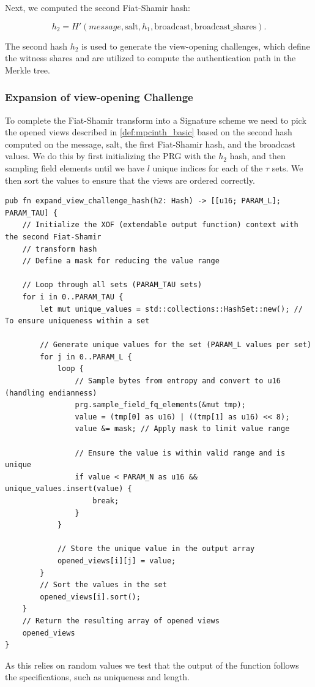 \documentclass[11pt]{report}
\theoremstyle{definition}
\theoremstyle{plain}
\begin{document}
Next, we computed the second Fiat-Shamir hash:

\[
  h_2 = H'(message, \text{salt}, h_1, \text{broadcast}, \text{broadcast\_shares}).
\]

The second hash $h_2$ is used to generate the view-opening challenges, which define the witness shares and are utilized to compute the authentication path in the Merkle tree.

\subsubsection{Expansion of view-opening Challenge}
To complete the Fiat-Shamir transform into a Signature scheme we need to pick the opened views described in \autoref{def:mpcinth_basic} based on the second hash computed on the message, salt, the first Fiat-Shamir hash, and the broadcast values.
We do this by first initializing the PRG with the $h_2$ hash, and then sampling field elements until we have $l$ unique indices for each of the $\tau$ sets. We then sort the values to ensure that the views are ordered correctly.
\begin{verbatim}
pub fn expand_view_challenge_hash(h2: Hash) -> [[u16; PARAM_L]; PARAM_TAU] {
    // Initialize the XOF (extendable output function) context with the second Fiat-Shamir
    // transform hash
    // Define a mask for reducing the value range

    // Loop through all sets (PARAM_TAU sets)
    for i in 0..PARAM_TAU {
        let mut unique_values = std::collections::HashSet::new(); // To ensure uniqueness within a set

        // Generate unique values for the set (PARAM_L values per set)
        for j in 0..PARAM_L {
            loop {
                // Sample bytes from entropy and convert to u16 (handling endianness)
                prg.sample_field_fq_elements(&mut tmp);
                value = (tmp[0] as u16) | ((tmp[1] as u16) << 8);
                value &= mask; // Apply mask to limit value range

                // Ensure the value is within valid range and is unique
                if value < PARAM_N as u16 && unique_values.insert(value) {
                    break;
                }
            }

            // Store the unique value in the output array
            opened_views[i][j] = value;
        }
        // Sort the values in the set
        opened_views[i].sort();
    }
    // Return the resulting array of opened views
    opened_views
}
\end{verbatim}
As this relies on random values we test that the output of the function follows the specifications, such as uniqueness and length.
\end{document}
